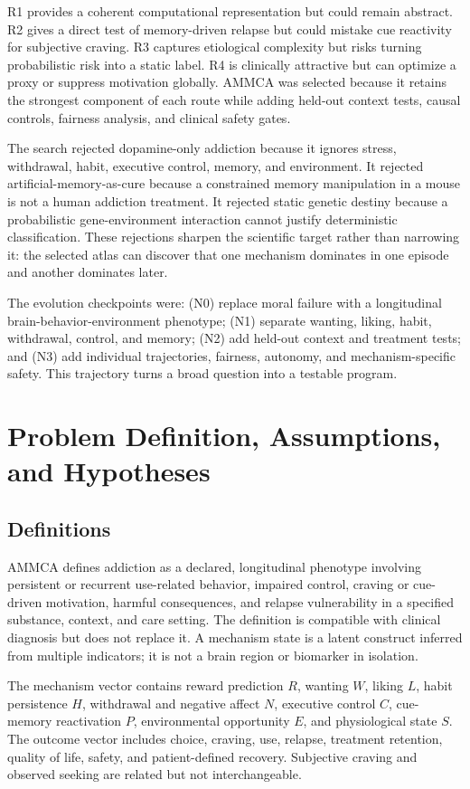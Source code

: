\documentclass[conference]{IEEEtran}
\begin{document}
R1 provides a coherent computational representation but could remain abstract. R2 gives a direct test of memory-driven relapse but could mistake cue reactivity for subjective craving. R3 captures etiological complexity but risks turning probabilistic risk into a static label. R4 is clinically attractive but can optimize a proxy or suppress motivation globally. AMMCA was selected because it retains the strongest component of each route while adding held-out context tests, causal controls, fairness analysis, and clinical safety gates.

The search rejected dopamine-only addiction because it ignores stress, withdrawal, habit, executive control, memory, and environment. It rejected artificial-memory-as-cure because a constrained memory manipulation in a mouse is not a human addiction treatment. It rejected static genetic destiny because a probabilistic gene-environment interaction cannot justify deterministic classification. These rejections sharpen the scientific target rather than narrowing it: the selected atlas can discover that one mechanism dominates in one episode and another dominates later.

The evolution checkpoints were: (N0) replace moral failure with a longitudinal brain-behavior-environment phenotype; (N1) separate wanting, liking, habit, withdrawal, control, and memory; (N2) add held-out context and treatment tests; and (N3) add individual trajectories, fairness, autonomy, and mechanism-specific safety. This trajectory turns a broad question into a testable program.

\section{Problem Definition, Assumptions, and Hypotheses}
\subsection{Definitions}
AMMCA defines addiction as a declared, longitudinal phenotype involving persistent or recurrent use-related behavior, impaired control, craving or cue-driven motivation, harmful consequences, and relapse vulnerability in a specified substance, context, and care setting. The definition is compatible with clinical diagnosis but does not replace it. A mechanism state is a latent construct inferred from multiple indicators; it is not a brain region or biomarker in isolation.

The mechanism vector contains reward prediction $R$, wanting $W$, liking $L$, habit persistence $H$, withdrawal and negative affect $N$, executive control $C$, cue-memory reactivation $P$, environmental opportunity $E$, and physiological state $S$. The outcome vector includes choice, craving, use, relapse, treatment retention, quality of life, safety, and patient-defined recovery. Subjective craving and observed seeking are related but not interchangeable.
\end{document}
